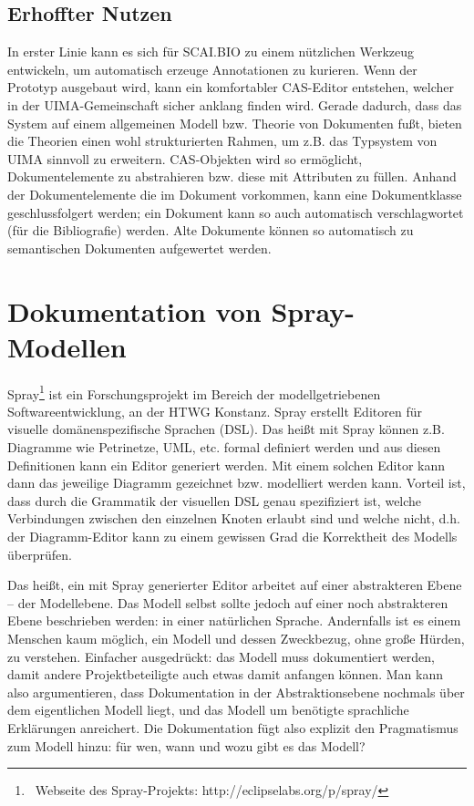  
\subsection{Erhoffter Nutzen}\label{}
 
In erster Linie kann es sich für SCAI.BIO zu einem nützlichen Werkzeug entwickeln, um automatisch erzeuge Annotationen zu kurieren. Wenn der Prototyp ausgebaut wird, kann ein komfortabler CAS-Editor entstehen, welcher in der UIMA-Gemeinschaft sicher anklang finden wird. Gerade dadurch, dass das System auf einem allgemeinen Modell bzw. Theorie von Dokumenten fußt, bieten die Theorien einen wohl strukturierten Rahmen, um z.B. das Typsystem von UIMA sinnvoll zu erweitern. CAS-Objekten wird so ermöglicht, Dokumentelemente zu abstrahieren bzw. diese mit Attributen zu füllen. Anhand der Dokumentelemente die im Dokument vorkommen, kann eine Dokumentklasse geschlussfolgert werden; ein Dokument kann so auch automatisch verschlagwortet (für die Bibliografie) werden. Alte Dokumente können so automatisch zu semantischen Dokumenten aufgewertet werden.

 
\section{Dokumentation von Spray-Modellen}\label{doku-spray}
 
Spray\footnote{~Webseite des Spray-Projekts: http://eclipselabs.org/p/spray/} ist ein Forschungsprojekt im Bereich der modellgetriebenen Softwareentwicklung, an der HTWG Konstanz. Spray erstellt Editoren für visuelle domänenspezifische Sprachen (DSL). Das heißt mit Spray können z.B. Diagramme wie Petrinetze, UML, etc. formal definiert werden und aus diesen Definitionen kann ein Editor generiert werden. Mit einem solchen Editor kann dann das jeweilige Diagramm gezeichnet bzw. modelliert werden kann. Vorteil ist, dass durch die Grammatik der visuellen DSL genau spezifiziert ist, welche Verbindungen zwischen den einzelnen Knoten erlaubt sind und welche nicht, d.h. der Diagramm-Editor kann zu einem gewissen Grad die Korrektheit des Modells überprüfen.

 
Das heißt, ein mit Spray generierter Editor arbeitet auf einer abstrakteren Ebene -- der Modellebene. Das Modell selbst sollte jedoch auf einer noch abstrakteren Ebene beschrieben werden: in einer natürlichen Sprache. Andernfalls ist es einem Menschen kaum möglich, ein Modell und dessen Zweckbezug, ohne große Hürden, zu verstehen. Einfacher ausgedrückt: das Modell muss dokumentiert werden, damit andere Projektbeteiligte auch etwas damit anfangen können. Man kann also argumentieren, dass Dokumentation in der Abstraktionsebene nochmals über dem eigentlichen Modell liegt, und das Modell um benötigte sprachliche Erklärungen anreichert. Die Dokumentation fügt also explizit den Pragmatismus zum Modell hinzu: für wen, wann und wozu gibt es das Modell?


